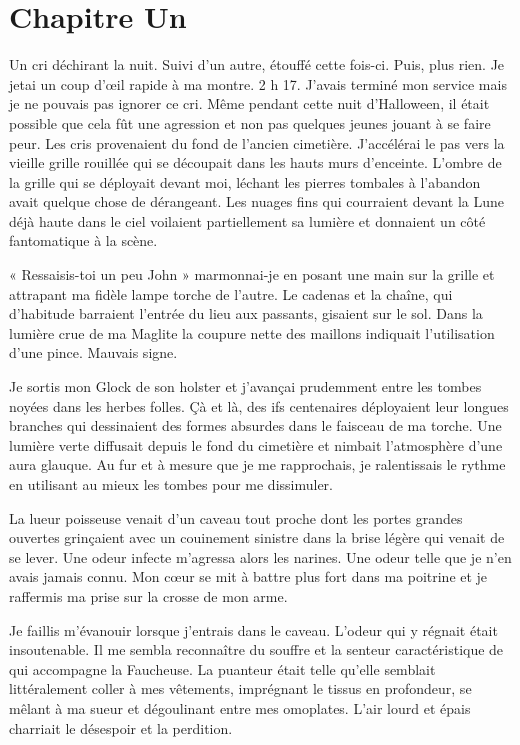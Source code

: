 \chapter[Chapitre Un]{Chapitre Un}
Un cri déchirant la nuit. Suivi d'un autre, étouffé cette fois-ci. Puis, plus rien. Je jetai un coup d'œil rapide à ma 
montre. 2 h 17. J'avais terminé mon service mais je ne pouvais pas ignorer ce cri. Même pendant cette nuit d'Halloween, 
il était possible que cela fût une agression et non pas quelques jeunes jouant à se faire peur. Les cris provenaient du 
fond de l'ancien cimetière. J'accélérai le pas vers la vieille grille rouillée qui se découpait dans les hauts murs 
d'enceinte. L'ombre de la grille qui se déployait devant moi, léchant les pierres tombales à l'abandon avait quelque 
chose de dérangeant. Les nuages fins qui courraient devant la Lune déjà haute dans le ciel voilaient partiellement sa 
lumière et donnaient un côté fantomatique à la scène.

« Ressaisis-toi un peu John » marmonnai-je en posant une main sur la grille et attrapant ma fidèle lampe torche de 
l'autre. Le cadenas et la chaîne, qui d'habitude barraient l'entrée du lieu aux passants, gisaient sur le sol. Dans la 
lumière crue de ma Maglite la coupure nette des maillons indiquait l'utilisation d'une pince. Mauvais signe.

Je sortis mon Glock de son holster et j'avançai prudemment entre les tombes noyées dans les herbes folles. Çà et là, 
des ifs centenaires déployaient leur longues branches qui dessinaient des formes absurdes dans le faisceau de ma 
torche. Une lumière verte diffusait depuis le fond du cimetière et nimbait l'atmosphère d'une aura glauque. Au fur et à 
mesure que je me rapprochais, je ralentissais le rythme en utilisant au mieux les tombes pour me dissimuler.

La lueur poisseuse venait d'un caveau tout proche dont les portes grandes ouvertes grinçaient avec un couinement 
sinistre dans la brise légère qui venait de se lever. Une odeur infecte m'agressa alors les narines. Une odeur telle 
que je n'en avais jamais connu. Mon cœur se mit à battre plus fort dans ma poitrine et je raffermis ma prise sur la 
crosse de mon arme.

Je faillis m'évanouir lorsque j'entrais dans le caveau. L'odeur qui y régnait était insoutenable. Il me sembla 
reconnaître du souffre et la senteur caractéristique de qui accompagne la Faucheuse. La puanteur était telle qu'elle 
semblait littéralement coller à mes vêtements, imprégnant le tissus en profondeur, se mêlant à ma sueur et dégoulinant 
entre mes omoplates. L'air lourd et épais charriait le désespoir et la perdition.

